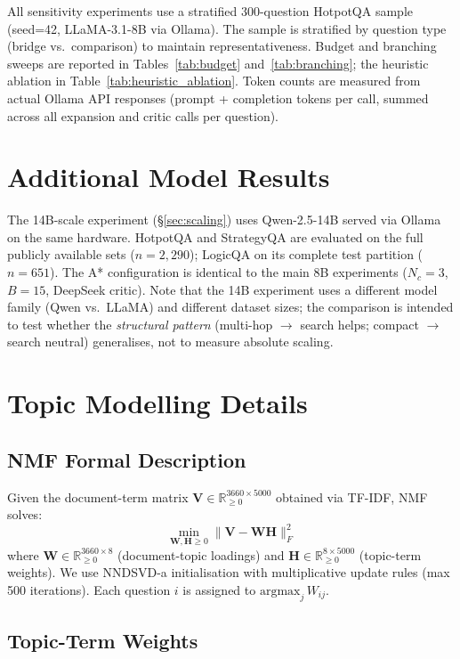 \documentclass{article}
\begin{document}
All sensitivity experiments use a stratified 300-question HotpotQA sample
(seed=42, LLaMA-3.1-8B via Ollama).  The sample is stratified by question
type (bridge vs.\ comparison) to maintain representativeness.  Budget and
branching sweeps are reported in Tables~\ref{tab:budget}
and~\ref{tab:branching}; the heuristic ablation in
Table~\ref{tab:heuristic_ablation}.  Token counts are measured from actual
Ollama API responses (prompt + completion tokens per call, summed across all
expansion and critic calls per question).

\section{Additional Model Results}
\label{app:additional_models}

The 14B-scale experiment (\S\ref{sec:scaling}) uses Qwen-2.5-14B served via
Ollama on the same hardware.  HotpotQA and StrategyQA are evaluated on the
full publicly available sets ($n{=}2{,}290$); LogicQA on its complete test
partition ($n{=}651$).  The A* configuration is identical to the main 8B
experiments ($N_c{=}3$, $B{=}15$, DeepSeek critic).  Note that the 14B
experiment uses a different model family (Qwen vs.\ LLaMA) and different
dataset sizes; the comparison is intended to test whether the
\emph{structural pattern} (multi-hop $\rightarrow$ search helps; compact
$\rightarrow$ search neutral) generalises, not to measure absolute scaling.

\section{Topic Modelling Details}
\label{app:topics}

\subsection{NMF Formal Description}

Given the document-term matrix $\mathbf{V}\in\mathbb{R}_{\ge0}^{3660\times5000}$
obtained via TF-IDF, NMF solves:
\[
\min_{\mathbf{W},\mathbf{H}\ge0} \|\mathbf{V} - \mathbf{W}\mathbf{H}\|_F^2
\]
where $\mathbf{W}\in\mathbb{R}_{\ge0}^{3660\times8}$ (document-topic loadings)
and $\mathbf{H}\in\mathbb{R}_{\ge0}^{8\times5000}$ (topic-term weights).
We use NNDSVD-a initialisation with multiplicative update rules (max 500
iterations).  Each question $i$ is assigned to $\mathrm{argmax}_j\,W_{ij}$.

\subsection{Topic-Term Weights}
\end{document}
